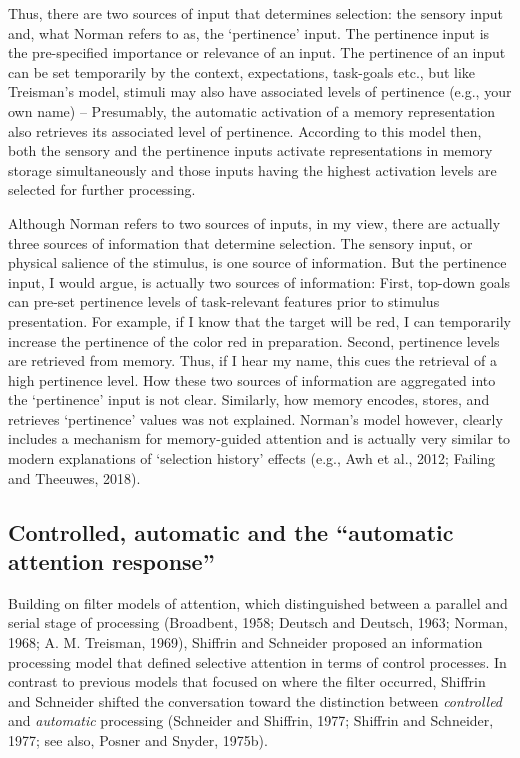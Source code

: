 \documentclass[]{DissertateCUNY}
\begin{document}
Thus, there are two sources of input that determines selection: the
sensory input and, what Norman refers to as, the `pertinence' input. The
pertinence input is the pre-specified importance or relevance of an
input. The pertinence of an input can be set temporarily by the context,
expectations, task-goals etc., but like Treisman's model, stimuli may
also have associated levels of pertinence (e.g., your own name) --
Presumably, the automatic activation of a memory representation also
retrieves its associated level of pertinence. According to this model
then, both the sensory and the pertinence inputs activate
representations in memory storage simultaneously and those inputs having
the highest activation levels are selected for further processing.

Although Norman refers to two sources of inputs, in my view, there are
actually three sources of information that determine selection. The
sensory input, or physical salience of the stimulus, is one source of
information. But the pertinence input, I would argue, is actually two
sources of information: First, top-down goals can pre-set pertinence
levels of task-relevant features prior to stimulus presentation. For
example, if I know that the target will be red, I can temporarily
increase the pertinence of the color red in preparation. Second,
pertinence levels are retrieved from memory. Thus, if I hear my name,
this cues the retrieval of a high pertinence level. How these two
sources of information are aggregated into the `pertinence' input is not
clear. Similarly, how memory encodes, stores, and retrieves `pertinence'
values was not explained. Norman's model however, clearly includes a
mechanism for memory-guided attention and is actually very similar to
modern explanations of `selection history' effects (e.g., Awh et al.,
2012; Failing and Theeuwes, 2018).

\hypertarget{controlled-automatic-and-the-automatic-attention-response}{%
\subsection{Controlled, automatic and the ``automatic attention
response''}\label{controlled-automatic-and-the-automatic-attention-response}}

Building on filter models of attention, which distinguished between a
parallel and serial stage of processing (Broadbent, 1958; Deutsch and
Deutsch, 1963; Norman, 1968; A. M. Treisman, 1969), Shiffrin and
Schneider proposed an information processing model that defined
selective attention in terms of control processes. In contrast to
previous models that focused on where the filter occurred, Shiffrin and
Schneider shifted the conversation toward the distinction between
\textit{controlled} and \textit{automatic} processing (Schneider and
Shiffrin, 1977; Shiffrin and Schneider, 1977; see also, Posner and
Snyder, 1975b).
\end{document}
